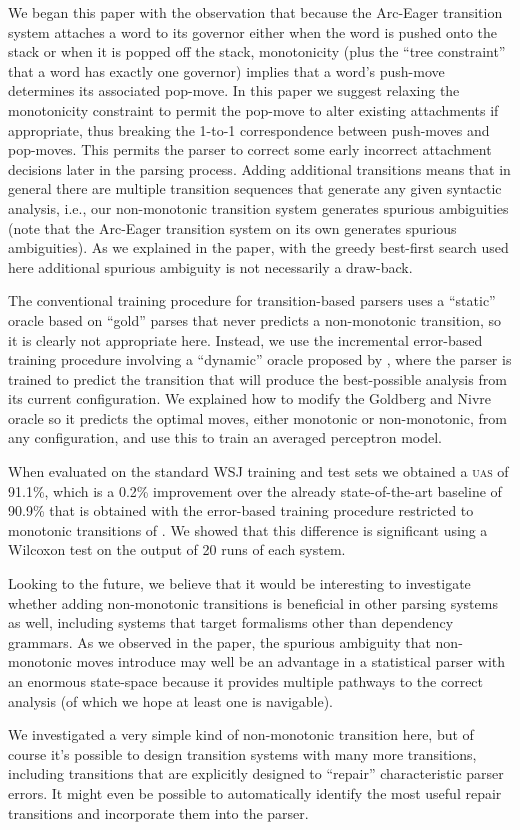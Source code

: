 \documentclass[11pt,letterpaper]{article}
\newcommand{\uas}{\textsc{uas}\xspace}
\newcommand{\note}[1]{\textcolor{red}{#1}}
\begin{document}
\noindent
We began this paper with the observation that because the Arc-Eager transition system \citep{nivre:04}
attaches a word to its governor either when the word is pushed onto the stack or when it is
popped off the stack, monotonicity (plus the ``tree constraint'' that a word has exactly one governor)
implies that a word's push-move determines its associated pop-move. In this paper we suggest relaxing
the monotonicity constraint to permit the pop-move to alter existing attachments if appropriate,
thus breaking the 1-to-1 correspondence between push-moves and pop-moves.  This permits the parser
to correct some early incorrect attachment decisions later in the parsing process.
Adding additional transitions means
that in general there are multiple transition sequences that generate any given syntactic analysis,
i.e., our non-monotonic transition system generates spurious ambiguities (note that the
Arc-Eager transition system on its own generates spurious ambiguities).
As we explained in the paper, with the greedy best-first search used here additional
spurious ambiguity is
not necessarily a draw-back.

The conventional training procedure for transition-based parsers uses a ``static'' oracle
based on ``gold'' parses that never predicts a non-monotonic transition, so it is clearly not
appropriate here.  Instead, we use the incremental error-based training procedure involving
a ``dynamic'' oracle proposed by  \citet{goldberg:12}, where the parser is trained to
predict the transition that will produce
the best-possible analysis from its current configuration.  We explained how to modify the Goldberg
and Nivre oracle so it predicts the optimal moves, either monotonic or non-monotonic,
from any configuration, and use this to train an averaged perceptron model.

When evaluated on the standard WSJ training and test sets we obtained a \uas of 91.1\%,
which is a 0.2\% improvement over the already state-of-the-art baseline of
90.9\% that is obtained with the error-based training procedure restricted to monotonic transitions of
\citet{goldberg:12}.  We showed that this difference is significant using a
Wilcoxon
test on the output of 20 runs of each system.

Looking to the future, we believe that it would be interesting to investigate whether
adding non-monotonic transitions is beneficial in other parsing systems as well, including
systems that target formalisms other than dependency grammars.  As we observed
in the paper, the spurious ambiguity that non-monotonic moves introduce may well be an
advantage in a statistical parser with an enormous state-space because it provides
multiple pathways to the correct analysis (of which we hope at least one is navigable).

We investigated a very simple kind of non-monotonic transition here, but of course it's
possible to design transition systems with many more transitions, including transitions
that are explicitly designed to ``repair'' characteristic parser errors.  It might even
be possible to automatically identify the most useful repair transitions and incorporate them
into the parser.



\end{document}

